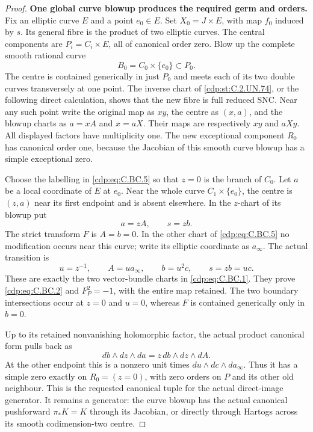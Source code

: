 \begin{proof}
\par\medskip\noindent\textbf{One global curve blowup produces the required germ and orders.}
Fix an elliptic curve \(E\) and a point \(e_0\in E\).
Set \(X_0=J\times E\), with map \(f_0\) induced by \(s\).
Its general fibre is the product of two elliptic curves.
The central components are \(P_i=C_i\times E\), all
of canonical order zero. Blow up the complete smooth
rational curve
\[
                      B_0=C_0\times\{e_0\}\subset P_0 .
                                                               \tag{C.BC.6}\label{cdp:eq:C.BC.6}
\]
The centre is contained generically in just \(P_0\) and
meets each of its two double curves transversely at one
point. The inverse chart of \ref{cdp:st:C.2.UN.74}, or the following direct
calculation, shows that the new fibre is full reduced SNC.
Near any such point write the original map as \(xy\),
the centre as \((x,a)\), and the blowup charts as
\(a=xA\) and \(x=aX\). Their maps are respectively
\(xy\) and \(aXy\). All displayed factors have
multiplicity one. The new exceptional component \(R_0\)
has canonical order one, because the Jacobian of this
smooth curve blowup has a simple exceptional zero.

Choose the labelling in \eqref{cdp:eq:C.BC.5} so that \(z=0\) is
the branch of \(C_0\). Let \(a\) be a local coordinate
of \(E\) at \(e_0\). Near the whole curve
\(C_1\times\{e_0\}\), the centre is \((z,a)\)
near its first endpoint and is absent elsewhere.
In the \(z\)-chart of its blowup put
\[
               a=zA,\qquad s=zb .                          \tag{C.BC.7}\label{cdp:eq:C.BC.7}
\]
The strict transform \(F\) is \(A=b=0\). In the other
chart of \eqref{cdp:eq:C.BC.5} no modification occurs near this curve;
write its elliptic coordinate as \(a_\infty\). The actual
transition is
\[
       u=z^{-1},\qquad A=u a_\infty,\qquad b=u^2c,
             \qquad s=zb=uc .                              \tag{C.BC.8}\label{cdp:eq:C.BC.8}
\]
These are exactly the two vector-bundle charts in \eqref{cdp:eq:C.BC.1}.
They prove \eqref{cdp:eq:C.BC.2} and \(F_P^2=-1\), with the entire
map retained. The two boundary intersections occur at
\(z=0\) and \(u=0\), whereas \(F\) is contained
generically only in \(b=0\).

Up to its retained nonvanishing holomorphic factor, the actual
product canonical form pulls back as
\[
 db\wedge dz\wedge da
       =z\,db\wedge dz\wedge dA .                          \tag{C.BC.9}\label{cdp:eq:C.BC.9}
\]
At the other endpoint this is a nonzero unit times
\(du\wedge dc\wedge da_\infty\). Thus it has a simple
zero exactly on \(R_0=(z=0)\), with zero orders on
\(P\) and its other old neighbour. This is the requested
canonical tuple for the actual direct-image generator.
It remains a generator: the curve blowup has the actual
canonical pushforward \(\pi_*K=K\) through its Jacobian,
or directly through Hartogs across its smooth codimension-two
centre.


\end{proof}
